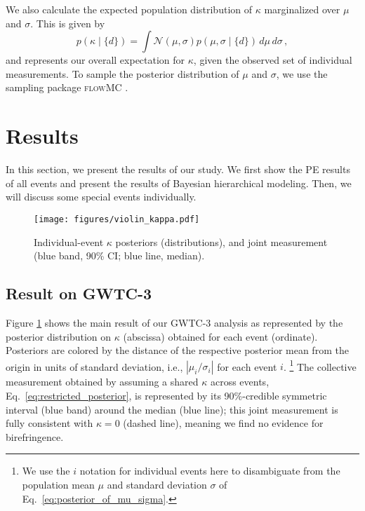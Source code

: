 \documentclass[aps,prd,twocolumn,superscriptaddress,preprintnumbers,floatfix,nofootinbib]{revtex4-2}
\begin{document}
We also calculate the expected population distribution of $\kappa$ marginalized over $\mu$ and $\sigma$.
This is given by
\begin{equation}
            p(\kappa\mid \{d\})=\int \mathcal{N}(\mu,\sigma)p(\mu,\sigma\mid \{d\})\,d\mu\,d\sigma\, , 
    \label{eq:generic_posterior}
\end{equation}
and represents our overall expectation for $\kappa$, given the observed set of individual measurements.
To sample the posterior distribution of $\mu$ and $\sigma$, we use the sampling package \textsc{flowMC} \citep{flowMC}.

\section{Results}
\label{sec:Results}

In this section, we present the results of our study.
We first show the \ac{PE} results of all events and present the results of Bayesian hierarchical modeling.
Then, we will discuss some special events individually.

\begin{figure}
    \texttt{[image: figures/violin\_kappa.pdf]}
    \caption{
        Individual-event $\kappa$ posteriors (distributions), and joint measurement (blue band, 90\% CI; blue line, median).
    }
    \label{fig:violin_kappa}
\end{figure}

\subsection{Result on GWTC-3}

Figure \ref{fig:violin_kappa} shows the main result of our GWTC-3 analysis
as represented by the posterior distribution on $\kappa$ (abscissa) obtained for each event (ordinate). Posteriors are colored by the distance of the respective posterior mean from the origin in units of standard deviation, i.e., $|\mu_i/\sigma_i|$ for each event $i$.%
\footnote{We use the $i$ notation for individual events here to disambiguate from the population mean $\mu$ and standard deviation $\sigma$ of Eq.~\eqref{eq:posterior_of_mu_sigma}.}
The collective measurement obtained by assuming a shared $\kappa$ across events, Eq.~\eqref{eq:restricted_posterior}, is represented by its 90\%-credible symmetric interval (blue band) around the median (blue line);
this joint measurement is fully consistent with $\kappa = 0$ (dashed line), meaning we find no evidence for birefringence.
\end{document}
